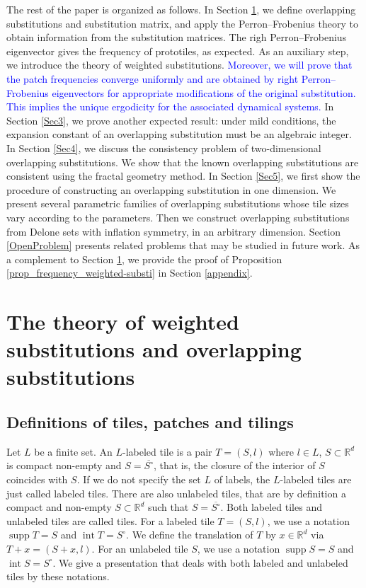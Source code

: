 \documentclass[a4]{amsart}
\DeclareMathOperator{\supp}{supp}
\DeclareMathOperator{\Int}{int}
\theoremstyle{definition}
\begin{document}
The rest of the paper is organized as follows. In Section \ref{Sec2}, we define overlapping substitutions and substitution matrix, and apply the Perron--Frobenius theory to obtain
information from the substitution matrices.
The righ Perron--Frobenius eigenvector gives the frequency of prototiles, as expected.
As an auxiliary step, we introduce the theory of weighted substitutions. \textcolor{blue}{Moreover, we will prove that the patch frequencies converge uniformly and are obtained by right Perron--Frobenius eigenvectors for appropriate modifications of the original substitution. This implies the unique ergodicity for the associated dynamical systems.}
In Section \ref{Sec3}, we prove another expected result: under mild conditions, the expansion constant of an overlapping substitution must be an algebraic integer.
In Section \ref{Sec4}, we discuss the consistency problem of two-dimensional overlapping substitutions. We show that the known overlapping substitutions are consistent using the fractal geometry method.
In Section \ref{Sec5}, we first show the procedure of constructing an overlapping substitution in one dimension. We present several parametric families of overlapping substitutions whose tile sizes vary according to the parameters. 
Then we construct overlapping substitutions from Delone sets with inflation symmetry, in an arbitrary dimension.
{\color{blue}Section \ref{OpenProblem} presents related problems that may be studied in future work. As a complement to Section \ref{Sec2}, we provide the proof of Proposition \ref{prop_frequency_weighted-substi} in Section \ref{appendix}.}

\section{The theory of weighted substitutions and overlapping substitutions}\label{Sec2}

\subsection{Definitions of tiles, patches and tilings}
Let $L$ be a finite set. An $L$-labeled tile is a pair $T=(S,l)$ where $l\in L$, $S\subset\mathbb{R}^d$ is compact non-empty and
$S=\overline{S^{\circ}}$, that is, the closure of the interior of $S$ coincides with $S$.
If we do not specify the set $L$ of labels, the $L$-labeled tiles are just called labeled tiles.
There are also unlabeled tiles, that are by definition a compact and non-empty $S\subset\mathbb{R}^d$ such that
$S=\overline{S^{\circ}}$.
Both labeled tiles and unlabeled tiles are called tiles.
For a labeled tile $T=(S,l)$, we use a notation $\supp T=S$ and $\Int T=S^{\circ}$.
We define the translation of $T$ by $x\in\mathbb{R}^d$ via $T+x=(S+x, l)$.
For an unlabeled tile $S$, we use a notation $\supp S=S$ and $\Int S=S^{\circ}$.
We give a presentation that deals with both labeled and unlabeled tiles by these notations.
\end{document}
